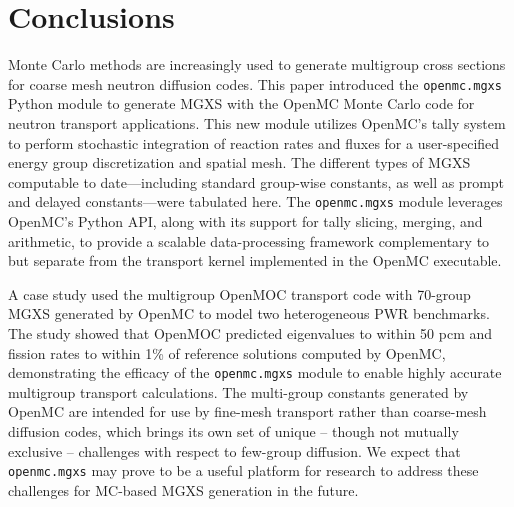 \section{Conclusions}
\label{sec:conclusions}

Monte Carlo methods are increasingly used to generate multigroup cross sections for coarse mesh neutron diffusion codes. This paper introduced the \texttt{openmc.mgxs} Python module to generate MGXS with the OpenMC Monte Carlo code for neutron transport applications. This new module utilizes OpenMC's tally system to perform stochastic integration of reaction rates and fluxes for a user-specified energy group discretization and spatial mesh. The different types of MGXS computable to date---including standard group-wise constants, as well as prompt and delayed constants---were tabulated here. The \texttt{openmc.mgxs} module leverages OpenMC's Python API, along with its support for tally slicing, merging, and arithmetic, to provide a scalable data-processing framework complementary to but separate from the transport kernel implemented in the OpenMC executable.

A case study used the multigroup OpenMOC transport code with 70-group MGXS generated by OpenMC to model two heterogeneous PWR benchmarks. The study showed that OpenMOC predicted eigenvalues to within 50 pcm and fission rates to within 1\% of reference solutions computed by OpenMC, demonstrating the efficacy of the \texttt{openmc.mgxs} module to enable highly accurate multigroup transport calculations. The multi-group constants generated by OpenMC are intended for use by fine-mesh transport rather than coarse-mesh diffusion codes, which brings its own set of unique -- though not mutually exclusive -- challenges with respect to few-group diffusion. We expect that \texttt{openmc.mgxs} may prove to be a useful platform for research to address these challenges for MC-based MGXS generation in the future.

